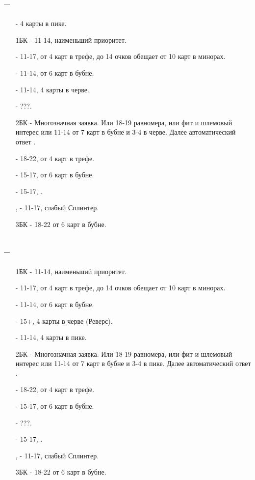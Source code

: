 \documentclass{article}
\begin{document}
\subsection{ -- }
\begin{enumerate}
    \item[\sp{1}] - 4 карты в пике.
    \item[1БК] - 11-14, наименьший приоритет.
    \item[\cl{2}] - 11-17, от 4 карт в трефе, до 14 очков обещает от 10 карт в минорах. 
    \item[\di{2}] - 11-14, от 6 карт в бубне.
    \item[\he{2}] - 11-14, 4 карты в черве.
    \item[\sp{2}] - ???.
    \item[2БК] - Многозначная заявка. Или 18-19 равномера, или фит и шлемовый интерес или 11-14 от 7 карт в бубне и 3-4 в черве. Далее автоматический ответ .
    \item[\cl{3}] - 18-22, от 4 карт в трефе.
    \item[\di{3}] - 15-17, от 6 карт в бубне.
    \item[\he{3}] - 15-17, .
    \item[\sp{3}, \cl{4}] - 11-17, слабый Сплинтер.
    \item[3БК] - 18-22 от 6 карт в бубне.
\end{enumerate}
\subsection{ -- }
\begin{enumerate}
    \item[1БК] - 11-14, наименьший приоритет.
    \item[\cl{2}] - 11-17, от 4 карт в трефе, до 14 очков обещает от 10 карт в минорах. 
    \item[\di{2}] - 11-14, от 6 карт в бубне.
    \item[\he{2}] - 15+, 4 карты в черве (Реверс).
    \item[\sp{2}] - 11-14, 4 карты в пике.
    \item[2БК] - Многозначная заявка. Или 18-19 равномера, или фит и шлемовый интерес или 11-14 от 7 карт в бубне и 3-4 в пике. Далее автоматический ответ .
    \item[\cl{3}] - 18-22, от 4 карт в трефе.
    \item[\di{3}] - 15-17, от 6 карт в бубне.
    \item[\he{3}] - ???.
    \item[\sp{3}] - 15-17, .
    \item[\cl{4}, \he{4}] - 11-17, слабый Сплинтер.
    \item[3БК] - 18-22 от 6 карт в бубне.
\end{enumerate}
\end{document}
